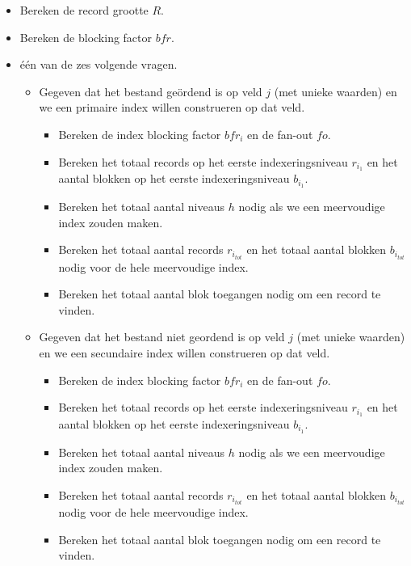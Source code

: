 \documentclass[indexstructuren.tex]{subfiles}
\begin{document}
\begin{itemize}
\item Bereken de record grootte $R$.
\item Bereken de blocking factor $bfr$.
\item \'e\'en van de zes volgende vragen.
\begin{itemize}
\item Gegeven dat het bestand ge\"ordend is op veld $j$ (met unieke waarden) en we een primaire index willen construeren op dat veld.
\begin{itemize}
\item Bereken de index blocking factor $bfr_i$ en de fan-out $fo$.
\item Bereken het totaal records op het eerste indexeringsniveau $r_{i_1}$ en het aantal blokken op het eerste indexeringsniveau $b_{i_1}$.
\item Bereken het totaal aantal niveaus $h$ nodig als we een meervoudige index zouden maken. 
\item Bereken het totaal aantal records $r_{i_{tot}}$ en het totaal aantal blokken $b_{i_{tot}}$ nodig voor de hele meervoudige index.
\item Bereken het totaal aantal blok toegangen nodig om een record te vinden.
\end{itemize}

\item
Gegeven dat het bestand niet geordend is op veld $j$ (met unieke waarden) en we een secundaire index willen construeren op dat veld.
\begin{itemize}
\item Bereken de index blocking factor $bfr_i$ en de fan-out $fo$.
\item Bereken het totaal records op het eerste indexeringsniveau $r_{i_1}$ en het aantal blokken op het eerste indexeringsniveau $b_{i_1}$.
\item Bereken het totaal aantal niveaus $h$ nodig als we een meervoudige index zouden maken. 
\item Bereken het totaal aantal records $r_{i_{tot}}$ en het totaal aantal blokken $b_{i_{tot}}$ nodig voor de hele meervoudige index.
\item Bereken het totaal aantal blok toegangen nodig om een record te vinden.
\end{itemize}


\end{itemize}
\end{itemize}
\end{document}
